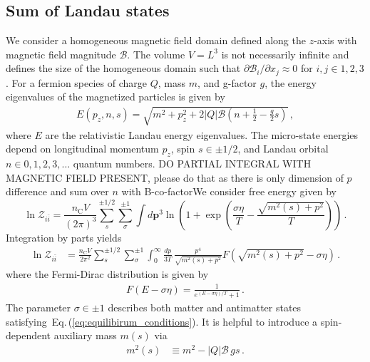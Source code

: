 \documentclass[epjST]{svjour}
\newcommand{\req}[1]{Eq.\,(\ref{#1})}
\begin{document}
\subsection{Sum of Landau states}
\label{sec:Landau}
We consider a homogeneous magnetic field domain defined along the $z$-axis with magnetic field magnitude $\mathcal{B}$. The volume $V=L^{3}$ is not necessarily infinite and defines the size of the homogeneous domain such that $\partial\mathcal{B}_{i}/\partial x_{j}\approx0$ for \(i,j \in {1,2,3}\). For a fermion species of charge $Q$, mass $m$, and g-factor $g$, the energy eigenvalues of the magnetized particles is given by~\cite{Steinmetz:2018ryf}
\begin{align}
\label{eq:energystates}
E(p_{z},n,s)=\sqrt{m^{2}+p_{z}^{2}+2|Q|\mathcal{B}\left(n+\frac{1}{2}-\frac{g}{2}s\right)}\,,
\end{align}
where $E$ are the relativistic Landau energy eigenvalues. The micro-state energies depend on longitudinal momentum \(p_{z}\), spin $s\in\pm1/2$, and Landau orbital $n\in0,1,2,3,\ldots$ quantum numbers. {\color{red}DO PARTIAL INTEGRAL WITH MAGNETIC FIELD PRESENT, please do that as there is only dimension of $p$ difference and sum over $n$ with B-co-factor}{\color{blue}We consider free energy given by 
\begin{equation}
 \ln\mathcal{Z}_{i\bar{i}} = \frac{n_\mathrm{C}V}{(2\pi)^{3}}\sum_{s}^{\pm1/2}\sum_{\sigma}^{\pm1}\int d\mathbf{p}^{3}\ln\left(1+\exp{\left(\frac{\sigma\eta}{T}-\frac{\sqrt{m^2(s)+p^{2}}}{T}\right)}\right)\,.
\end{equation}
Integration by parts yields
\begin{align}
\label{eq:partition_byparts}
\ln\mathcal{Z}_{i\bar{i}} &= \frac{n_\mathrm{C}V}{2\pi^{2}} \sum_{s}^{\pm1/2}\sum_{\sigma}^{\pm1}\int_{0}^{\infty} \frac{dp}{3T} \, \frac{p^4}{\sqrt{m^2(s)+p^{2}}}F\left(\sqrt{m^2(s)+p^{2}} - \sigma\eta\right)\,.
\end{align}
where} the Fermi-Dirac distribution is given by
\begin{align}
\label{eq:FermiDirac}
F\left(E - \sigma\eta\right) = \frac{1}{e^{(E - \sigma\eta)/T} + 1}\,.
\end{align}
The parameter \(\sigma \in {\pm1}\) describes both matter and antimatter states satisfying~\req{eq:equilibirum_conditions}. It is helpful to introduce a spin-dependent auxiliary mass $m(s)$ via
\begin{align}
\label{eq:spinmass}
m^{2}(s) &\equiv m^{2} - |Q|\mathcal{B}\,g s\,.
\end{align}
\end{document}
